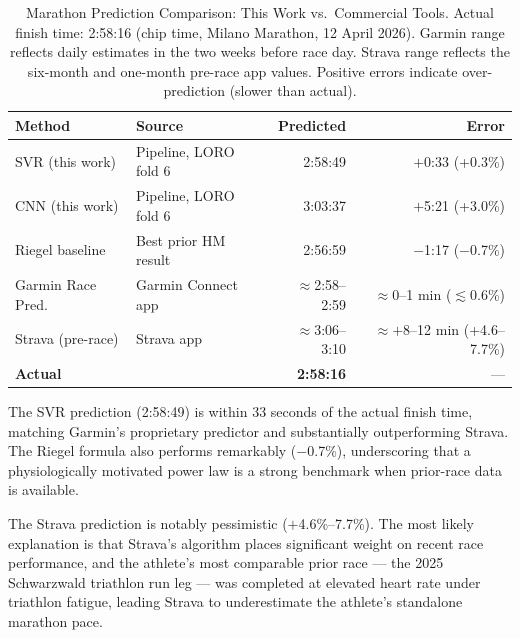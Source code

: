 \documentclass[11pt, a4paper]{article}
\begin{document}
\begin{table}[htbp]
  \centering
  \caption{Marathon Prediction Comparison: This Work vs.\ Commercial Tools.
           Actual finish time: 2:58:16 (chip time, Milano Marathon, 12 April 2026).
           Garmin range reflects daily estimates in the two weeks before race day.
           Strava range reflects the six-month and one-month pre-race app values.
           Positive errors indicate over-prediction (slower than actual).}
  \label{tab:benchmark}
  \small
  \begin{tabular}{llrr}
    \toprule
    \textbf{Method} & \textbf{Source} & \textbf{Predicted} & \textbf{Error} \\
    \midrule
    \cellcolor{goodgreen}SVR (this work)
      & Pipeline, LORO fold 6      & 2:58:49 & $+$0:33 (+0.3\%) \\
    CNN (this work)
      & Pipeline, LORO fold 6      & 3:03:37 & $+$5:21 (+3.0\%) \\
    Riegel baseline
      & Best prior HM result       & 2:56:59 & $-$1:17 ($-$0.7\%) \\
    \midrule
    \cellcolor{goodgreen}Garmin Race Pred.
      & Garmin Connect app         & $\approx$2:58--2:59
                                   & $\approx$0--1 min ($\lesssim$0.6\%) \\
    \midrule
    Strava (pre-race)
      & Strava app                 & $\approx$3:06--3:10
                                   & $\approx+$8--12 min (+4.6--7.7\%) \\
    \midrule
    \textbf{Actual}
      &                            & \textbf{2:58:16}   & --- \\
    \bottomrule
  \end{tabular}
\end{table}

The SVR prediction (2:58:49) is within 33 seconds of the actual finish time,
matching Garmin's proprietary predictor and substantially outperforming Strava.
The Riegel formula also performs remarkably ($-$0.7\%), underscoring that a
physiologically motivated power law is a strong benchmark when prior-race
data is available.

The Strava prediction is notably pessimistic ($+$4.6\%--7.7\%).
The most likely explanation is that Strava's algorithm places significant
weight on recent race performance, and the athlete's most comparable prior
race --- the 2025 Schwarzwald triathlon run leg --- was completed at elevated
heart rate under triathlon fatigue, leading Strava to underestimate the
athlete's standalone marathon pace.
\end{document}
